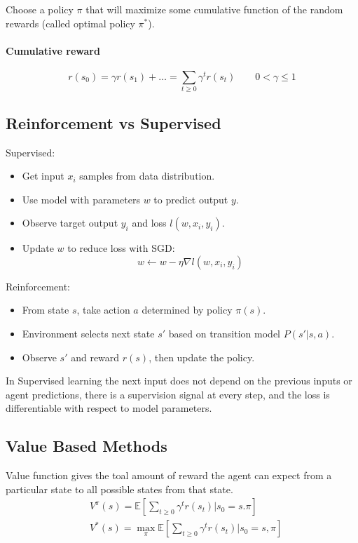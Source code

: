 \documentclass[a4paper,6pt,twocolumn,fleqn]{article}
\begin{document}
Choose a policy \(\pi\) that will maximize some cumulative function of the random rewards (called optimal policy \(\pi^*\)).

\paragraph{Cumulative reward}
\begin{equation}
    r(s_0) = \gamma r(s_1) + \ldots = \sum_{t \geq 0} \gamma^t r(s_t) \qquad 0 < \gamma \leq 1
\end{equation}

\subsection{Reinforcement vs Supervised} %
Supervised:
\begin{itemize}
    \item Get input \(x_i\) samples from data distribution.
    \item Use model with parameters \(w\) to predict output \(y\).
    \item Observe target output \(y_i\) and loss \(l(w,x_i,y_i)\).
    \item Update \(w\) to reduce loss with SGD:
    \begin{equation}
        w \gets w - \eta \nabla l (w, x_i, y_i)
    \end{equation}
\end{itemize}
Reinforcement:
\begin{itemize}
    \item From state \(s\), take action \(a\) determined by policy \(\pi(s)\).
    \item Environment selects next state \(s'\) based on transition model \(P(s' | s,a)\).
    \item Observe \(s'\) and reward \(r(s)\), then update the policy.
\end{itemize}

In Supervised learning the next input does not depend on the previous inputs or agent predictions, there is a supervision signal at every step, and the loss is differentiable with respect to model parameters.


\subsection{Value Based Methods} %
Value function gives the toal amount of reward the agent can expect from a particular state to all possible states from that state.
\begin{align}
    &V^\pi (s) = \mathbb E \left[ \sum_{t \geq 0} \gamma^t r(s_t) | s_0 = s. \pi \right]\\
    &V^*(s) = \max_\pi \mathbb E \left[ \sum_{t \geq 0} \gamma^t r(s_t) | s_0 = s, \pi \right]
\end{align}
\end{document}
